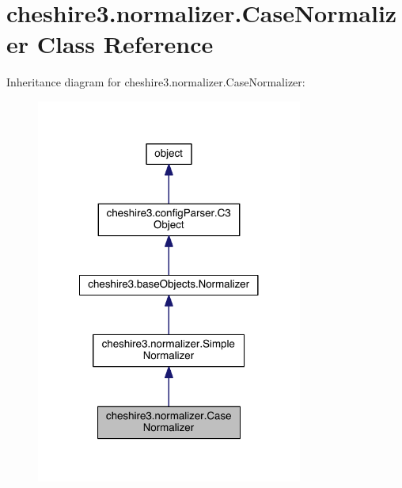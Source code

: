 \hypertarget{classcheshire3_1_1normalizer_1_1_case_normalizer}{\section{cheshire3.\-normalizer.\-Case\-Normalizer Class Reference}
\label{classcheshire3_1_1normalizer_1_1_case_normalizer}
}


Inheritance diagram for cheshire3.\-normalizer.\-Case\-Normalizer\-:
\nopagebreak
\begin{figure}[H]
\begin{center}
\leavevmode
\includegraphics[width=248pt]{classcheshire3_1_1normalizer_1_1_case_normalizer__inherit__graph}
\end{center}
\end{figure}


